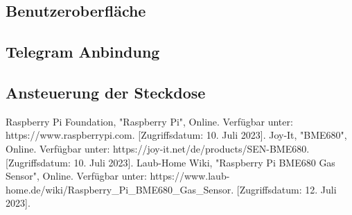 \documentclass[conference]{IEEEtran}
\begin{document}
\subsection{Benutzeroberfläche}
\subsection{Telegram Anbindung}
\subsection{Ansteuerung der Steckdose}


\begin{thebibliography}{00}
Raspberry Pi Foundation, "Raspberry Pi", Online. Verfügbar unter: https://www.raspberrypi.com. [Zugriffsdatum: 10. Juli 2023].
Joy-It, "BME680", Online. Verfügbar unter: https://joy-it.net/de/products/SEN-BME680. [Zugriffsdatum: 10. Juli 2023].
Laub-Home Wiki, "Raspberry Pi BME680 Gas Sensor", Online. Verfügbar unter: https://www.laub-home.de/wiki/Raspberry\_Pi\_BME680\_Gas\_Sensor. [Zugriffsdatum: 12. Juli 2023].
\end{thebibliography}
\end{document}
